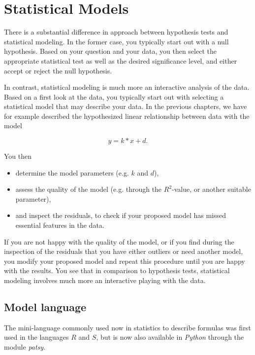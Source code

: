 \chapter{ Statistical Models }\label{chapter:Models}

There is a substantial difference in approach between hypothesis tests and statistical modeling. In the former case, you typically start out with a null hypothesis. Based on your question and your data, you then select the appropriate statistical test as well as the desired significance level, and either accept or reject the null hypothesis.

In contrast, statistical modeling is much more an interactive analysis of the data. Based on a first look at the data, you typically start out with selecting a statistical model that may describe your data. In the previous chapters, we have for example described the hypothesized linear relationship between data with the model

\begin{equation*}
  y = k*x + d .
\end{equation*}

You then
\begin{itemize}
  \item determine the model parameters (e.g. $k$ and $d$),
  \item assess the quality of the model (e.g. through the $R^2$-value, or another suitable parameter),
  \item and inspect the residuals, to check if your proposed model has missed essential features in the data.
\end{itemize}

If you are not happy with the quality of the model, or if you find during the inspection of the residuals that you have either outliers or need another model, you modify your proposed model and repeat this procedure until you are happy with the results. You see that in comparison to hypothesis tests, statistical modeling involves much more an interactive playing with the data.

\section{Model language}
The mini-language commonly used now in statistics to describe formulas was first used in the languages $R$ and $S$, but is now also available in \emph{Python} through the module \emph{patsy}.

